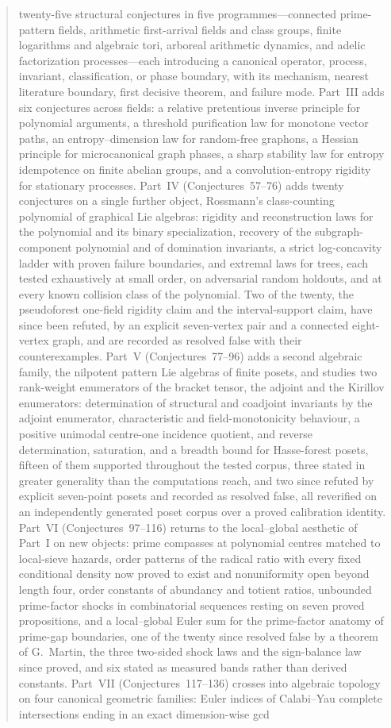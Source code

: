 \documentclass[11pt]{article}
\theoremstyle{definition}
\begin{document}
\begin{abstract}
twenty-five structural conjectures in five programmes---connected
prime-pattern fields, arithmetic first-arrival fields and class groups,
finite logarithms and algebraic tori, arboreal arithmetic dynamics, and
adelic factorization processes---each introducing a canonical operator,
process, invariant, classification, or phase boundary, with its mechanism,
nearest literature boundary, first decisive theorem, and failure mode.
  Part~III adds six conjectures across fields: a relative pretentious inverse principle for polynomial arguments, a threshold purification law for monotone vector paths, an entropy--dimension law for random-free graphons, a Hessian principle for microcanonical graph phases, a sharp stability law for entropy idempotence on finite abelian groups, and a convolution-entropy rigidity for stationary processes.  Part~IV (Conjectures~57--76) adds twenty conjectures on a single further object, Rossmann's class-counting polynomial of graphical Lie algebras: rigidity and reconstruction laws for the polynomial and its binary specialization, recovery of the subgraph-component polynomial and of domination invariants, a strict log-concavity ladder with proven failure boundaries, and extremal laws for trees, each tested exhaustively at small order, on adversarial random holdouts, and at every known collision class of the polynomial.  Two of the twenty, the pseudoforest one-field rigidity claim and the interval-support claim, have since been refuted, by an explicit seven-vertex pair and a connected eight-vertex graph, and are recorded as resolved false with their counterexamples.  Part~V (Conjectures~77--96) adds a second algebraic family, the nilpotent pattern Lie algebras of finite posets, and studies two rank-weight enumerators of the bracket tensor, the adjoint and the Kirillov enumerators: determination of structural and coadjoint invariants by the adjoint enumerator, characteristic and field-monotonicity behaviour, a positive unimodal centre-one incidence quotient, and reverse determination, saturation, and a breadth bound for Hasse-forest posets, fifteen of them supported throughout the tested corpus, three stated in greater generality than the computations reach, and two since refuted by explicit seven-point posets and recorded as resolved false, all reverified on an independently generated poset corpus over a proved calibration identity.  Part~VI (Conjectures~97--116) returns to the local--global aesthetic of Part~I on new objects: prime compasses at polynomial centres matched to local-sieve hazards, order patterns of the radical ratio with every fixed conditional density now proved to exist and nonuniformity open beyond length four, order constants of abundancy and totient ratios, unbounded prime-factor shocks in combinatorial sequences resting on seven proved propositions, and a local--global Euler sum for the prime-factor anatomy of prime-gap boundaries, one of the twenty since resolved false by a theorem of G.~Martin, the three two-sided shock laws and the sign-balance law since proved, and six stated as measured bands rather than derived constants.  Part~VII (Conjectures~117--136) crosses into algebraic topology on four canonical geometric families: Euler indices of Calabi--Yau complete intersections ending in an exact dimension-wise gcd 
\end{abstract}
\end{document}
